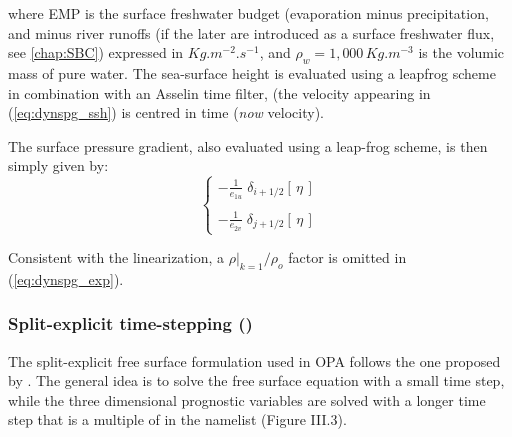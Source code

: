 \documentclass[../main/NEMO_manual]{subfiles}
\begin{document}
where EMP is the surface freshwater budget (evaporation minus precipitation, and minus river runoffs
(if the later are introduced as a surface freshwater flux, see \autoref{chap:SBC}) expressed in $Kg.m^{-2}.s^{-1}$,
and $\rho_w =1,000\,Kg.m^{-3}$ is the volumic mass of pure water.
The sea-surface height is evaluated using a leapfrog scheme in combination with an Asselin time filter,
(\ie the velocity appearing in (\autoref{eq:dynspg_ssh}) is centred in time (\textit{now} velocity). 

The surface pressure gradient, also evaluated using a leap-frog scheme, is then simply given by:
\begin{equation}
  \label{eq:dynspg_exp}
  \left\{
    \begin{aligned}
      - \frac{1}    						{e_{1u}} \;	\delta_{i+1/2} \left[  \,\eta\,  \right] \\ \\
      - \frac{1}    						{e_{2v}} \;	\delta_{j+1/2} \left[  \,\eta\,  \right]
    \end{aligned}
  \right.
\end{equation} 

Consistent with the linearization, a $\left. \rho \right|_{k=1} / \rho_o$ factor is omitted in
(\autoref{eq:dynspg_exp}). 

\subsubsection{Split-explicit time-stepping (\protect{})}
\label{subsec:DYN_spg_ts}

The split-explicit free surface formulation used in OPA follows the one proposed by \citet{Griffies2004}.
The general idea is to solve the free surface equation with a small time step,
while the three dimensional prognostic variables are solved with a longer time step that
is a multiple of  in the  namelist (Figure III.3). 
\end{document}
